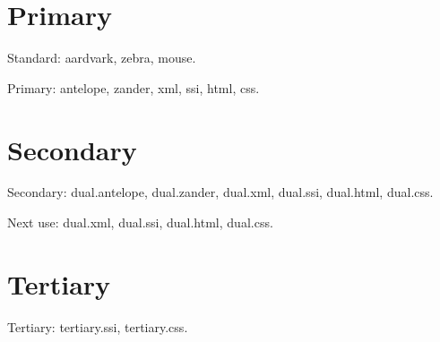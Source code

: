 \documentclass{report}
\begin{document}
\chapter{Primary}

Standard: \gls{aardvark}, \gls{zebra}, \gls{mouse}.

Primary: \gls{antelope}, \gls{zander}, \gls{xml}, \gls{ssi},
\gls{html}, \gls{css}.

\chapter{Secondary}

Secondary: \gls{dual.antelope}, \gls{dual.zander}, \gls{dual.xml},
\gls{dual.ssi}, \gls{dual.html}, \gls{dual.css}.

Next use: \gls{dual.xml},
\gls{dual.ssi}, \gls{dual.html}, \gls{dual.css}.

\chapter{Tertiary}

Tertiary: \gls{tertiary.ssi}, \gls{tertiary.css}.

\printunsrtglossary
\printunsrtglossary[type=abbreviations]
\printunsrtglossary[type=index,style=mcolindexgroup]
\end{document}
